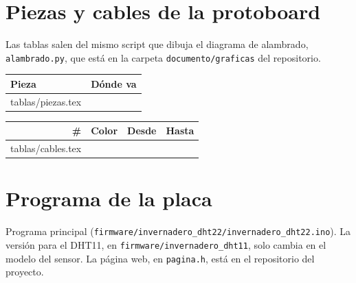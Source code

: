 \documentclass[12pt, letterpaper]{article}
\makeatletter
\newcommand{\entrada}[1]{\@@input #1 }
\makeatother
\begin{document}
\newpage
\appendix

\section{Piezas y cables de la protoboard}
\label{anexo:cables}

Las tablas salen del mismo script que dibuja el diagrama de alambrado, \texttt{alambrado.py}, que está en la carpeta
\texttt{documento/graficas} del repositorio.

\begin{longtable}{p{}p{}}
\toprule
\textbf{Pieza} & \textbf{Dónde va} \\
\midrule
\endhead
\entrada{tablas/piezas.tex}
\bottomrule
\end{longtable}

\begin{longtable}{rlp{}p{}}
\toprule
\textbf{\#} & \textbf{Color} & \textbf{Desde} & \textbf{Hasta} \\
\midrule
\endhead
\entrada{tablas/cables.tex}
\bottomrule
\end{longtable}

\section{Programa de la placa}

Programa principal (\texttt{firmware/invernadero\_dht22/invernadero\_dht22.ino}). La versión para el DHT11, en
\texttt{firmware/invernadero\_dht11}, solo cambia en el modelo del sensor. La página web, en \texttt{pagina.h}, está en el
repositorio del proyecto.


\end{document}

